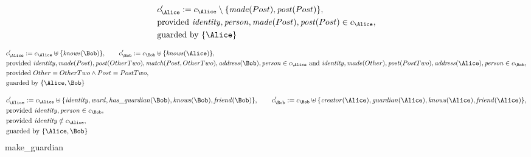 \begin{align*}
&
c'_
{
\Alice
}
 := 
c_
{
\Alice
}
 \setminus 
\{
\mathit{\detokenize{
made
}}
(
Post
)
,
\mathit{\detokenize{
post
}}
(
Post
)
\}
,\\
&
\text{provided } 
\mathit{\detokenize{
identity
}}
,
\mathit{\detokenize{
person
}}
,
\mathit{\detokenize{
made
}}
(
Post
)
,
\mathit{\detokenize{
post
}}
(
Post
)
 \in c_
{
\Alice
}
,\\
&
\text{guarded by } \{
\Alice
\}
\end{align*}

\begin{align*}
&
c'_
{
\Alice
}
 := 
c_
{
\Alice
}
 \uplus 
\{
\mathit{\detokenize{
knows
}}
(
\Bob
)
\}
, \qquad 
c'_
{
\Bob
}
 := 
c_
{
\Bob
}
 \uplus 
\{
\mathit{\detokenize{
knows
}}
(
\Alice
)
\}
,\\
&
\text{provided } 
\mathit{\detokenize{
identity
}}
,
\mathit{\detokenize{
made
}}
(
Post
)
,
\mathit{\detokenize{
post
}}
(
OtherTwo
)
,
\mathit{\detokenize{
match
}}
(
Post
,
OtherTwo
)
,
\mathit{\detokenize{
address
}}
(
\Bob
)
,
\mathit{\detokenize{
person
}}
 \in c_
{
\Alice
}
 \text{ and } 
\mathit{\detokenize{
identity
}}
,
\mathit{\detokenize{
made
}}
(
Other
)
,
\mathit{\detokenize{
post
}}
(
PostTwo
)
,
\mathit{\detokenize{
address
}}
(
\Alice
)
,
\mathit{\detokenize{
person
}}
 \in c_
{
\Bob
}
,\\
&
\text{provided } 
Other
=
OtherTwo
\land
Post
=
PostTwo
,\\
&
\text{guarded by } \{
\Alice
,
\Bob
\}
\end{align*}

\begin{align*}
&
c'_
{
\Alice
}
 := 
c_
{
\Alice
}
 \uplus 
\{
\mathit{\detokenize{
identity
}}
,
\mathit{\detokenize{
ward
}}
,
\mathit{\detokenize{
has_guardian
}}
(
\Bob
)
,
\mathit{\detokenize{
knows
}}
(
\Bob
)
,
\mathit{\detokenize{
friend
}}
(
\Bob
)
\}
, \qquad 
c'_
{
\Bob
}
 := 
c_
{
\Bob
}
 \uplus 
\{
\mathit{\detokenize{
creator
}}
(
\Alice
)
,
\mathit{\detokenize{
guardian
}}
(
\Alice
)
,
\mathit{\detokenize{
knows
}}
(
\Alice
)
,
\mathit{\detokenize{
friend
}}
(
\Alice
)
\}
,\\
&
\text{provided } 
\mathit{\detokenize{
identity
}}
,
\mathit{\detokenize{
person
}}
 \in c_
{
\Bob
}
,\\
&
\text{provided } 
\mathit{\detokenize{
identity
}}
 \notin c_
{
\Alice
}
,\\
&
\text{guarded by } \{
\Alice
,
\Bob
\}
\end{align*}
\iffalse
make_guardian
